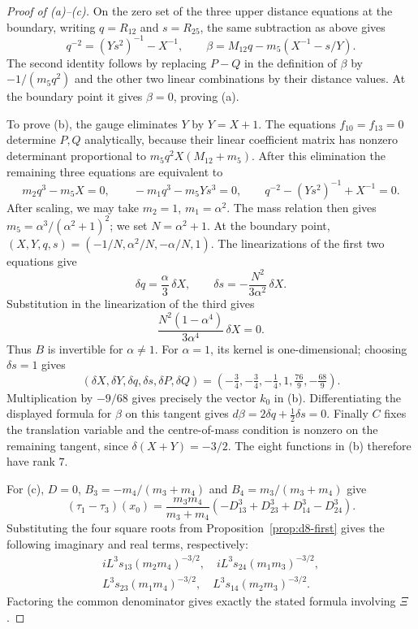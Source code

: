 \documentclass[Threeside,11pt]{article}
\theoremstyle{definition}
\theoremstyle{remark}
\numberwithin{equation}{section}
\theoremstyle{remark}
\begin{document}
{\begin{proof}[Proof of (a)--(c)]
On the zero set of the three upper distance equations at the boundary, writing $q=R_{12}$
and $s=R_{25}$, the same subtraction as above gives
\[
q^{-2}=(Ys^2)^{-1}-X^{-1},\qquad
\beta=M_{12}q-m_5(X^{-1}-s/Y).
\]
The second identity follows by replacing $P-Q$ in the definition of
$\beta$ by $-1/(m_5q^2)$ and the other two linear combinations by their
distance values. At the boundary point it gives $\beta=0$, proving (a).

To prove (b), the gauge eliminates $Y$ by $Y=X+1$.
The equations $f_{10}=f_{13}=0$ determine $P,Q$ analytically, because
their linear coefficient matrix has nonzero determinant proportional to
$m_5q^2X(M_{12}+m_5)$.
After this elimination the remaining three equations are equivalent to
\[
m_2q^3-m_5X=0,\qquad
-m_1q^3-m_5Ys^3=0,\qquad
q^{-2}-(Ys^2)^{-1}+X^{-1}=0.
\]
After scaling, we may take $m_2=1$, $m_1=\alpha^2$.  The mass relation then gives
$m_5=\alpha^3/(\alpha^2+1)^2$; we set $N=\alpha^2+1$.
At the boundary point,
$(X,Y,q,s)=(-1/N,\alpha^2/N,-\alpha/N,1)$.
The linearizations of the first two equations give
\[
\delta q=\frac\alpha3\,\delta X,\qquad
\delta s=-\frac{N^2}{3\alpha^2}\,\delta X.
\]
Substitution in the linearization of the third gives
\[
\frac{N^2(1-\alpha^4)}{3\alpha^4}\,\delta X=0.
\]
Thus $B$ is invertible for $\alpha\ne1$.
For $\alpha=1$, its kernel is one-dimensional; choosing $\delta s=1$
gives
\[
(\delta X,\delta Y,\delta q,\delta s,\delta P,\delta Q)
=(-\tfrac34,-\tfrac34,-\tfrac14,1,\tfrac{76}{9},-\tfrac{68}{9}).
\]
Multiplication by $-9/68$ gives precisely the vector $k_0$ in (b).
Differentiating the displayed formula for $\beta$ on this tangent gives
$d\beta=2\delta q+\tfrac12\delta s=0$.
Finally $C$ fixes the translation variable and the centre-of-mass
condition is nonzero on the remaining tangent, since
$\delta(X+Y)=-3/2$. The eight functions in (b) therefore have rank $7$.

For (c), $D=0$, $B_3=-m_4/(m_3+m_4)$ and $B_4=m_3/(m_3+m_4)$ give
\[
(\tau_1-\tau_3)(x_0)
=\frac{m_3m_4}{m_3+m_4}
(-D_{13}^3+D_{23}^3+D_{14}^3-D_{24}^3).
\]
Substituting the four square roots from Proposition~\ref{prop:d8-first}
gives the following imaginary and real terms, respectively:
\[
\begin{gathered}
 iL^3s_{13}(m_2m_4)^{-3/2},\quad iL^3s_{24}(m_1m_3)^{-3/2},\\
 L^3s_{23}(m_1m_4)^{-3/2},\quad L^3s_{14}(m_2m_3)^{-3/2}.
\end{gathered}
\]
Factoring the common denominator gives
exactly the stated formula involving $\Xi$.
\end{proof}

}
\end{document}
